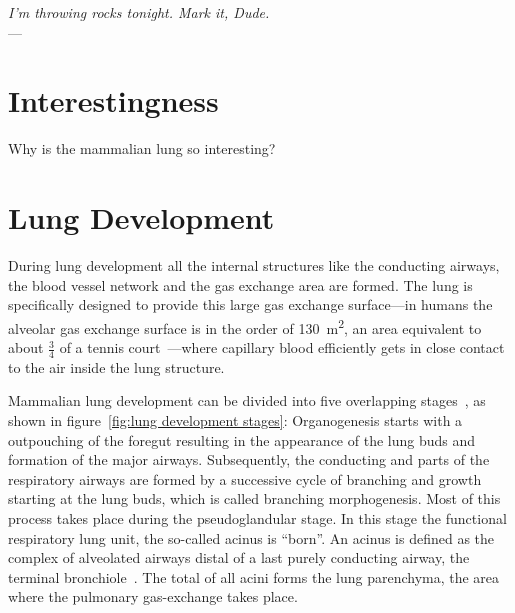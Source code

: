 \label{ch:lung}
\begin{flushright}{\slshape I'm throwing rocks tonight. Mark it, Dude.} \\ \medskip
    ---  \citep{TheBigLebowski}
\end{flushright}
\bigskip
\section{Interestingness}
Why is the mammalian lung so interesting?

\section{Lung Development}
During lung development all the internal structures like the conducting airways, the blood vessel network and the gas exchange area are formed. The lung is specifically designed to provide this large gas exchange surface---in humans the alveolar gas exchange surface is in the order of \SI{130}{\meter\squared}, an area equivalent to about $\frac{3}{4}$ of a tennis court~\cite{Weibel2009}---where capillary blood efficiently gets in close contact to the air inside the lung structure. 

Mammalian lung development can be divided into five overlapping stages~\cite{Schittny2004,Schittny2007a}, as shown in figure~\ref{fig:lung development stages}: Organogenesis starts with a outpouching of the foregut resulting in the appearance of the lung buds and formation of the major airways. Subsequently, the conducting and parts of the respiratory airways are formed by a successive cycle of branching and growth starting at the lung buds, which is called branching morphogenesis. Most of this process takes place during the pseudoglandular stage. In this stage the functional respiratory lung unit, the so-called acinus is ``born''. An acinus is defined as the complex of alveolated airways distal of a last purely conducting airway, the terminal bronchiole~\cite{Rodriguez1987}. The total of all acini forms the lung parenchyma, the area where the pulmonary gas-exchange takes place.

